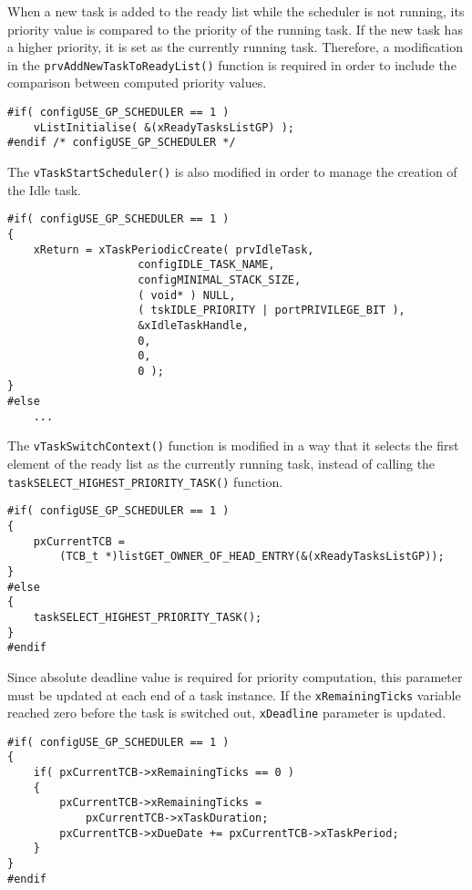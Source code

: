 When a new task is added to the ready list while the scheduler is not running, its priority value is compared to the priority of the running task. 
If the new task has a higher priority, it is set as the currently running task.
Therefore, a modification in the \verb$prvAddNewTaskToReadyList()$ function is required in order to include the comparison between computed priority values. 
\begin{lstlisting}[frame=none, label={newtask}, caption={Modification of the \texttt{prvAddNewTaskToReadyList()} function.}, captionpos=b]
#if( configUSE_GP_SCHEDULER == 1 )
	vListInitialise( &(xReadyTasksListGP) );
#endif /* configUSE_GP_SCHEDULER */
\end{lstlisting}
The \verb$vTaskStartScheduler()$ is also modified in order to manage the creation of the Idle task.
\begin{lstlisting}[frame=none, label={idle}, caption={Creation of the Idle task.}, captionpos=b]
#if( configUSE_GP_SCHEDULER == 1 )
{
	xReturn = xTaskPeriodicCreate( prvIdleTask,
					configIDLE_TASK_NAME,
					configMINIMAL_STACK_SIZE,
					( void* ) NULL,
					( tskIDLE_PRIORITY | portPRIVILEGE_BIT ),
					&xIdleTaskHandle,
					0,
					0,
					0 );
}
#else 
	...
\end{lstlisting}
The \verb$vTaskSwitchContext()$ function is modified in a way that it selects the first element of the ready list as the currently running task, instead of calling the \\\verb$taskSELECT_HIGHEST_PRIORITY_TASK()$ function.
\begin{lstlisting}[frame=none, label={switchcontext}, caption={\texttt{vTaskSwitchContext()} modification.}, captionpos=b]
#if( configUSE_GP_SCHEDULER == 1 )
{
	pxCurrentTCB =
		(TCB_t *)listGET_OWNER_OF_HEAD_ENTRY(&(xReadyTasksListGP));
}
#else 
{
	taskSELECT_HIGHEST_PRIORITY_TASK();
}
#endif
\end{lstlisting} 
Since absolute deadline value is required for priority computation, this parameter must be updated at each end of a task instance.
If the \verb$xRemainingTicks$ variable reached zero before the task is switched out, \verb$xDeadline$ parameter is updated.
\begin{lstlisting}[frame=none, label={taskfinish}, caption={\texttt{Updating the \texttt{xDeadline} parameter at the end of task instance}.}, captionpos=b]
#if( configUSE_GP_SCHEDULER == 1 )
{
	if( pxCurrentTCB->xRemainingTicks == 0 ) 
	{
		pxCurrentTCB->xRemainingTicks = 
			pxCurrentTCB->xTaskDuration;
		pxCurrentTCB->xDueDate += pxCurrentTCB->xTaskPeriod;
	}
}
#endif
\end{lstlisting}
